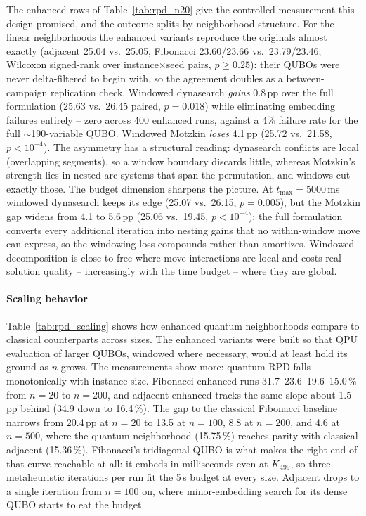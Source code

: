 \documentclass[preprint,12pt,authoryear]{elsarticle}
\begin{document}
The enhanced rows of Table~\ref{tab:rpd_n20} give the controlled
measurement this design promised, and the outcome splits by
neighborhood structure. For the linear neighborhoods the enhanced
variants reproduce the originals almost exactly (adjacent 25.04 vs.\
25.05, Fibonacci 23.60/23.66 vs.\ 23.79/23.46; Wilcoxon signed-rank
over instance$\times$seed pairs, $p \geq 0.25$): their QUBOs were never
delta-filtered to begin with, so the agreement doubles as a
between-campaign replication check. Windowed dynasearch \emph{gains}
0.8\,pp over the full formulation (25.63 vs.\ 26.45 paired,
$p = 0.018$) while eliminating embedding failures entirely -- zero
across 400 enhanced runs, against a 4\% failure rate for the full
$\sim$190-variable QUBO. Windowed Motzkin \emph{loses} 4.1\,pp
(25.72 vs.\ 21.58, $p < 10^{-4}$). The asymmetry
has a structural reading: dynasearch conflicts are local (overlapping
segments), so a window boundary discards little, whereas Motzkin's
strength lies in nested arc systems that span the permutation, and
windows cut exactly those. The budget dimension sharpens the picture.
At $t_{\max} = 5000$\,ms windowed dynasearch keeps its edge (25.07 vs.\
26.15, $p = 0.005$), but the Motzkin gap widens from 4.1 to 5.6\,pp
(25.06 vs.\ 19.45, $p < 10^{-4}$): the full formulation converts every
additional iteration into
nesting gains that no within-window move can express, so the windowing
loss compounds rather than amortizes. Windowed decomposition is close
to free where move interactions are local and costs real solution
quality -- increasingly with the time budget -- where they are
global.

\paragraph{Scaling behavior}
Table~\ref{tab:rpd_scaling} shows how enhanced quantum neighborhoods
compare to classical counterparts across sizes. The enhanced variants
were built so that QPU evaluation of larger QUBOs, windowed where
necessary, would at least hold its ground as $n$ grows. The
measurements show more: quantum RPD falls monotonically with
instance size. Fibonacci enhanced runs 31.7--23.6--19.6--15.0\,\%
from $n = 20$ to $n = 200$, and adjacent enhanced tracks the same
slope about 1.5\,pp behind (34.9 down to 16.4\,\%). The gap to the
classical Fibonacci baseline narrows from 20.4\,pp at $n = 20$ to
13.5 at $n = 100$, 8.8 at $n = 200$, and 4.6 at $n = 500$, where the
quantum neighborhood (15.75\,\%) reaches parity with classical
adjacent (15.36\,\%). Fibonacci's tridiagonal QUBO is what makes the
right end of that curve reachable at all: it embeds in milliseconds
even at $K_{499}$, so three metaheuristic iterations per run fit the
5\,s budget at every size. Adjacent drops to a single iteration from
$n = 100$ on, where minor-embedding search for its dense QUBO starts
to eat the budget.
\end{document}
